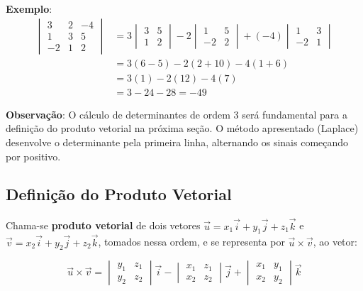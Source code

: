\begin{enumerate}[label=\alph*)]
    \textbf{Exemplo}:
    \begin{align*}
      \begin{vmatrix}
        3 & 2 & -4 \\
        1 & 3 & 5 \\
        -2 & 1 & 2 
      \end{vmatrix}
      &= 3\begin{vmatrix}
        3 & 5 \\
        1 & 2 
      \end{vmatrix}
      - 2\begin{vmatrix}
        1 & 5 \\
        -2 & 2 
      \end{vmatrix}
      + (-4)\begin{vmatrix}
        1 & 3 \\
        -2 & 1 
      \end{vmatrix} \\
      &= 3(6-5) - 2(2+10) -4(1+6) \\
      &= 3(1) - 2(12) -4(7) \\
      &= 3 - 24 - 28 = -49
    \end{align*}
\end{enumerate}

\begin{center}
\begin{minipage}{0.9\textwidth}
  \textbf{Observação}: O cálculo de determinantes de ordem 3 será fundamental
  para a definição do produto vetorial na próxima seção. O método apresentado
  (Laplace) desenvolve o determinante pela primeira linha, alternando os sinais
  começando por positivo.
\end{minipage}
\end{center}

\subsection{Definição do Produto Vetorial}

Chama-se \textbf{produto vetorial} de dois vetores 
$\vec{u} = x_1\vec{i} + y_1\vec{j} + z_1\vec{k}$ e 
$\vec{v} = x_2\vec{i} + y_2\vec{j} + z_2\vec{k}$, tomados nessa ordem, e se
representa por $\vec{u} \times \vec{v}$, ao vetor:

\begin{equation}
  \vec{u} \times \vec{v} = 
  \begin{vmatrix}
    y_1 & z_1 \\
    y_2 & z_2 
  \end{vmatrix} \vec{i} -
  \begin{vmatrix}
    x_1 & z_1 \\
    x_2 & z_2 
  \end{vmatrix} \vec{j} +
  \begin{vmatrix}
    x_1 & y_1 \\
    x_2 & y_2 
  \end{vmatrix} \vec{k}
  \label{eq:produto_vetorial_def}
\end{equation}

